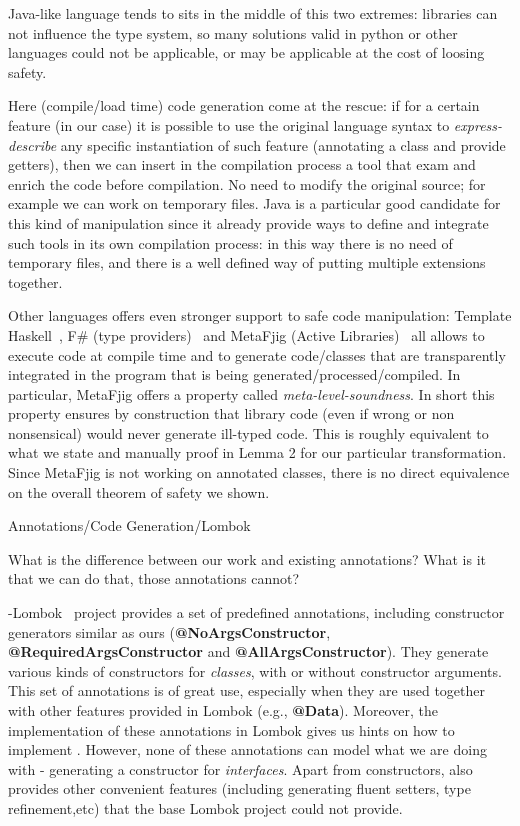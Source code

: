 Java-like language tends to sits in the middle of this two extremes:
libraries can not influence the type system, so many solutions valid in python or other languages could not be applicable, or may be applicable at the cost of loosing safety.

Here (compile/load time) code generation come at the rescue: 
if for a certain feature (\mixin in our case) it is possible to use the original language syntax to
\emph{express-describe} any specific instantiation of such feature
(annotating a class and provide getters), then we can insert in the compilation process a tool that exam and enrich the code before compilation. No need to modify the original source; for example we can work on temporary files.
Java is a particular good candidate for this kind of manipulation since it already provide ways to define and integrate such tools in its own compilation process: in this way there is no need of temporary files, and there is a well defined way of putting multiple extensions together.

Other languages offers even stronger support to safe code manipulation:
Template Haskell~\cite{}, F\# (type providers)~\cite{} and MetaFjig (Active Libraries)~\cite{}
all allows to execute code at compile time and to generate code/classes that are transparently integrated in the program that is being generated/processed/compiled.
In particular, MetaFjig offers a property called \emph{meta-level-soundness}. In short this property ensures by construction that library code (even if wrong or non nonsensical) would never generate ill-typed code. This is roughly equivalent to what we state and manually proof in Lemma 2 for our particular transformation.
Since MetaFjig is not working on annotated classes, there is no direct equivalence on the overall theorem of safety we shown.

Annotations/Code Generation/Lombok

What is the difference between our work and existing annotations?
What is it that we can do that, those annotations cannot?

-Lombok~\cite{} project provides a set of predefined annotations, including
constructor generators similar as ours (\textbf{@NoArgsConstructor},
\textbf{@RequiredArgsConstructor} and \textbf{@AllArgsConstructor}). They
generate various kinds of constructors for \emph{classes}, with or without
constructor arguments. This set of annotations is of great use, especially when
they are used together with other features provided in Lombok (e.g.,
\textbf{@Data}). Moreover, the implementation of these annotations in Lombok
gives us hints on how to implement \mixin. However, none of these annotations
can model what we are doing with \mixin - generating a constructor for
\emph{interfaces}. Apart from constructors, \mixin also provides other
convenient features (including generating fluent setters, type refinement,etc)
that the base Lombok project could not provide.

